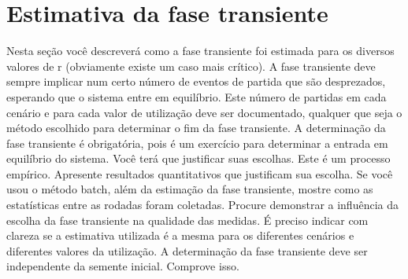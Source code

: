 \chapter{Estimativa da fase transiente}

Nesta seção você descreverá como a fase transiente foi estimada para os diversos valores de
r (obviamente existe um caso mais crítico). A fase transiente deve sempre implicar num
certo número de eventos de partida que são desprezados, esperando que o sistema entre em
equilíbrio. Este número de partidas em cada cenário e para cada valor de utilização deve ser
documentado, qualquer que seja o método escolhido para determinar o fim da fase
transiente.
A determinação da fase transiente é obrigatória, pois é um exercício para determinar a
entrada em equilíbrio do sistema. Você terá que justificar suas escolhas. Este é um processo
empírico.
Apresente resultados quantitativos que justificam sua escolha. Se você usou o método
batch, além da estimação da fase transiente, mostre como as estatísticas entre as rodadas
foram coletadas.
Procure demonstrar a influência da escolha da fase transiente na qualidade das medidas.
É preciso indicar com clareza se a estimativa utilizada é a mesma para os diferentes
cenários e diferentes valores da utilização. A determinação da fase transiente deve ser
independente da semente inicial. Comprove isso.
